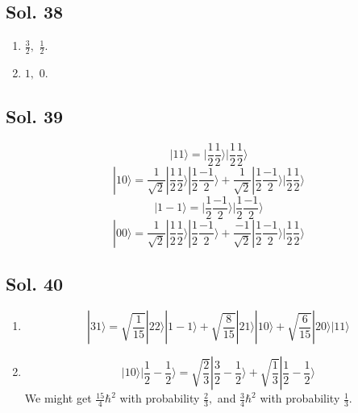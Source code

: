        \subsection*{Sol. 38}
       \begin{enumerate}
           \item $\frac{3}{2},$ $\frac{1}{2}.$
           \item $1,$ $0.$
       \end{enumerate}

       \subsection*{Sol. 39}
       $$
       |11\rangle
       =|\frac{1}{2}\frac{1}{2}\rangle
       |\frac{1}{2}\frac{1}{2}\rangle
       $$
       $$
       |10\rangle
       =\frac{1}{\sqrt{2}}|\frac{1}{2}\frac{1}{2}\rangle
       |\frac{1}{2}\frac{-1}{2}\rangle
       +
       \frac{1}{\sqrt{2}}
       |\frac{1}{2}\frac{-1}{2}\rangle
       |\frac{1}{2}\frac{1}{2}\rangle
       $$
       $$
       |1-1\rangle
       =|\frac{1}{2}\frac{-1}{2}\rangle
       |\frac{1}{2}\frac{-1}{2}\rangle
       $$
       $$
       |00\rangle
       =\frac{1}{\sqrt{2}}|\frac{1}{2}\frac{1}{2}\rangle
       |\frac{1}{2}\frac{-1}{2}\rangle
       +\frac{-1}{\sqrt{2}}|\frac{1}{2}\frac{-1}{2}\rangle
       |\frac{1}{2}\frac{1}{2}\rangle
       $$

       \subsection*{Sol. 40}
       \begin{enumerate}
           \item 
           $$
           |31\rangle
           =
           \sqrt{\frac{1}{15}}
           |22\rangle|1-1\rangle
           +
           \sqrt{\frac{8}{15}}
           |21\rangle|10\rangle
           +
           \sqrt{\frac{6}{15}}
           |20\rangle|11\rangle
           $$
           \item 
           $$
           |10\rangle
           |\frac{1}{2}-\frac{1}{2}\rangle
           =
           \sqrt{\frac{2}{3}}
           |\frac{3}{2}-\frac{1}{2}\rangle
           +
           \sqrt{\frac{1}{3}}
           |\frac{1}{2}-\frac{1}{2}\rangle
           $$
           We might get $\frac{15}{4}\hbar^2$ with probability $\frac{2}{3},$ and 
           $\frac{3}{4}\hbar^2$ with probability $\frac{1}{3}.$
       \end{enumerate}

